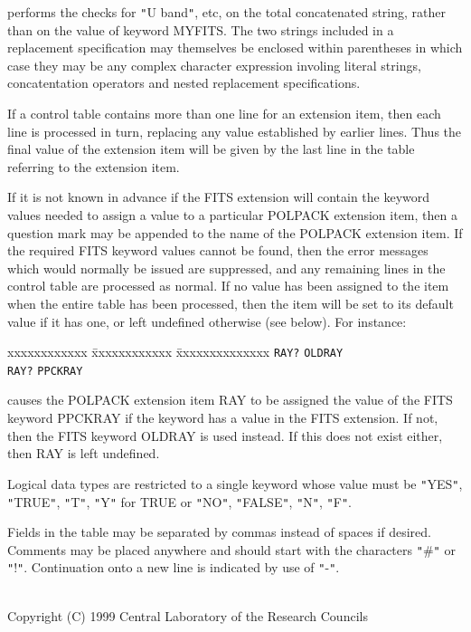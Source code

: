 \documentclass[twoside,11pt]{article}
\renewcommand{\_}{\texttt{\symbol{95}}}
\newcommand{\sstdiytopic}[2]{\item[{\hspace{-0.35em}#1\hspace{-0.35em}:}]
\mbox{} \\[1.3ex] #2}
\newcommand{\sstdiytopic}[2]{\item[{#1}] #2 }
\begin{document}
{{      performs the checks for {\tt "}U band{\tt "}, etc, on the total 
      concatenated
      string, rather than on the value of keyword MYFITS. The two 
      strings included in a replacement specification may themselves be 
      enclosed within parentheses in which case they may be any complex
      character expression involing literal strings, concatentation
      operators and nested replacement specifications.

      If a control table contains more than one line for an extension
      item, then each line is processed in turn, replacing any value
      established by earlier lines. Thus the final value of the extension
      item will be given by the last line in the table referring to the
      extension item.

      If it is not known in advance if the FITS extension will contain the
      keyword values needed to assign a value to a particular POLPACK
      extension item, then a question mark may be appended to the name of
      the POLPACK extension item. If the required FITS keyword values
      cannot be found, then the error messages which would normally be
      issued are suppressed, and any remaining lines in the control table
      are processed as normal. If no value has been assigned to the item
      when the entire table has been processed, then the item will be set
      to its default value if it has one, or left undefined otherwise (see
      below). For instance:

\begin{tabbing}
 xxxxxxxxxxxx \= xxxxxxxxxxxx            \= xxxxxxxxxxxxxx \kill
              \>  \texttt{RAY?}          \> \texttt{OLDRAY} \\
              \>  \texttt{RAY?}          \> \texttt{PPCKRAY} 
\end{tabbing}

      causes the POLPACK extension item RAY to be assigned the value of the
      FITS keyword PPCKRAY if the keyword has a value in the FITS
      extension. If not, then the FITS keyword OLDRAY is used instead. If
      this does not exist either, then RAY is left undefined.

      Logical data types are restricted to a single keyword whose value
      must be {\tt "}YES{\tt "}, {\tt "}TRUE{\tt "}, {\tt "}T{\tt "}, {\tt "}Y{\tt "} for TRUE or {\tt "}NO{\tt "}, {\tt "}FALSE{\tt "}, {\tt "}N{\tt "},
      {\tt "}F{\tt "}.

      Fields in the table may be separated by commas instead of spaces if 
      desired. Comments may be placed anywhere and should start with the 
      characters {\tt "}\#{\tt "} or {\tt "}!{\tt "}. Continuation onto 
      a new line is indicated by use of {\tt "}-{\tt "}.
   }
   \sstdiytopic{
      Copyright
   }{
      Copyright (C) 1999 Central Laboratory of the Research Councils
   }
}
\end{document}
